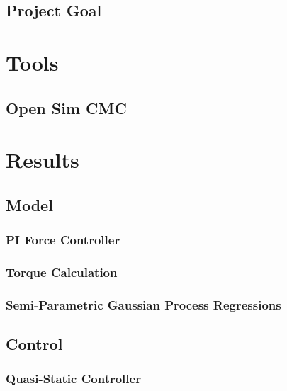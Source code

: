 \documentclass[a4paper,twoside,11pt]{report} %
\begin{document}

\pagecolor{white}
\pagestyle{empty}
\cleardoublepage 

\clearpage 
\pagestyle{main}

\clearpage 

\clearpage 

\cleardoublepage 
\tableofcontents
\cleardoublepage 



\section{Project Goal}

\chapter{Tools}

\section{Open Sim CMC}

\cleardoublepage 
%
\cleardoublepage 

\cleardoublepage 

\chapter{Results}
\section{Model}
\subsection{PI Force Controller}
\subsection{Torque Calculation}
\subsection{Semi-Parametric Gaussian Process Regressions}
\section{Control}
\subsection{Quasi-Static Controller}
\end{document}
